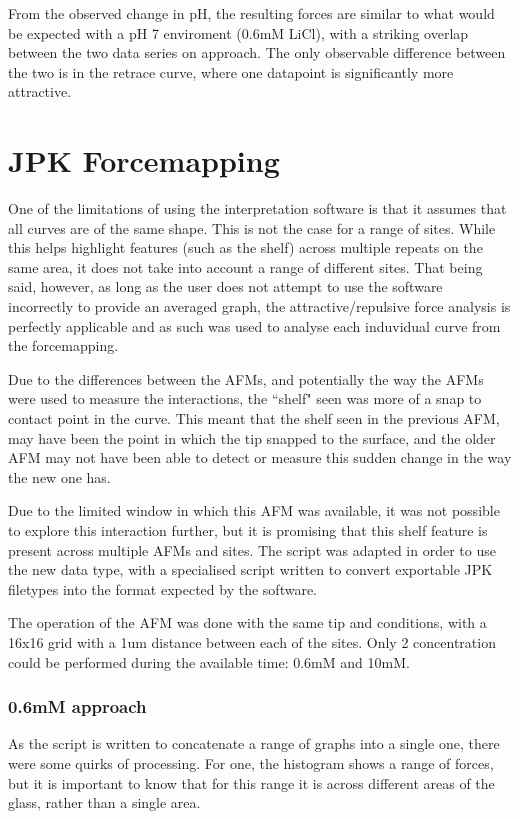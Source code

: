 From the observed change in pH, the resulting forces are similar to what would be expected with a pH 7 enviroment (0.6mM LiCl), with a striking overlap between the two data series on approach. The only observable difference between the two is in the retrace curve, where one datapoint is significantly more attractive. 

\newpage
\section{JPK Forcemapping}

One of the limitations of using the interpretation software is that it assumes that all curves are of the same shape. This is not the case for a range of sites. While this helps highlight features (such as the shelf) across multiple repeats on the same area, it does not take into account a range of different sites. That being said, however, as long as the user does not attempt to use the software incorrectly to provide an averaged graph, the attractive/repulsive force analysis is perfectly applicable and as such was used to analyse each induvidual curve from the forcemapping.

Due to the differences between the AFMs, and potentially the way the AFMs were used to measure the interactions, the ``shelf" seen was more of a snap to contact point in the curve. This meant that the shelf seen in the previous AFM, may have been the point in which the tip snapped to the surface, and the older AFM may not have been able to detect or measure this sudden change in the way the new one has. 

Due to the limited window in which this AFM was available, it was not possible to explore this interaction further, but it is promising that this shelf feature is present across multiple AFMs and sites. The script was adapted in order to use the new data type, with a specialised script written to convert exportable JPK filetypes into the format expected by the software.

The operation of the AFM was done with the same tip and conditions, with a 16x16 grid with a 1um distance between each of the sites. Only 2 concentration could be performed during the available time: 0.6mM and 10mM.

\subsubsection{0.6mM approach}

As the script is written to concatenate a range of graphs into a single one, there were some quirks of processing. For one, the histogram shows a range of forces, but it is important to know that for this range it is across different areas of the glass, rather than a single area.

